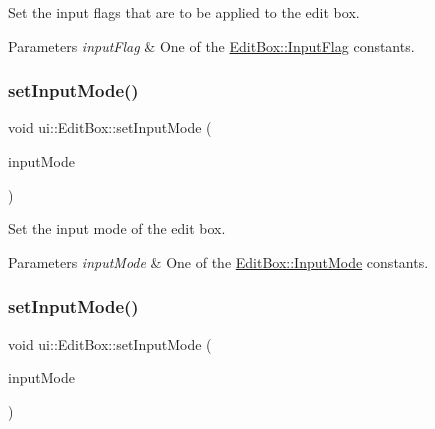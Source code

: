 Set the input flags that are to be applied to the edit box. 
\begin{DoxyParams}{Parameters}
{\em input\+Flag} & One of the \hyperlink{classui_1_1EditBox_af02f13ee9fba51d59bb3111e200848c8}{Edit\+Box\+::\+Input\+Flag} constants. \\
\hline
\end{DoxyParams}
\mbox{\label{classui_1_1EditBox_ad1b58227c6cf26800613983688c82066}} 
\subsubsection{\texorpdfstring{set\+Input\+Mode()}{setInputMode()}\hspace{0.1cm}{\footnotesize\ttfamily [1/2]}}
{\footnotesize\ttfamily void ui\+::\+Edit\+Box\+::set\+Input\+Mode (\begin{DoxyParamCaption}\item[{\hyperlink{classui_1_1EditBox_a7a1bfe8f3ba218bedfcf5451ec3ce01a}{Edit\+Box\+::\+Input\+Mode}}]{input\+Mode }\end{DoxyParamCaption})}

Set the input mode of the edit box. 
\begin{DoxyParams}{Parameters}
{\em input\+Mode} & One of the \hyperlink{classui_1_1EditBox_a7a1bfe8f3ba218bedfcf5451ec3ce01a}{Edit\+Box\+::\+Input\+Mode} constants. \\
\hline
\end{DoxyParams}
\mbox{\label{classui_1_1EditBox_ad1b58227c6cf26800613983688c82066}} 
\subsubsection{\texorpdfstring{set\+Input\+Mode()}{setInputMode()}\hspace{0.1cm}{\footnotesize\ttfamily [2/2]}}
{\footnotesize\ttfamily void ui\+::\+Edit\+Box\+::set\+Input\+Mode (\begin{DoxyParamCaption}\item[{\hyperlink{classui_1_1EditBox_a7a1bfe8f3ba218bedfcf5451ec3ce01a}{Input\+Mode}}]{input\+Mode }\end{DoxyParamCaption})}

